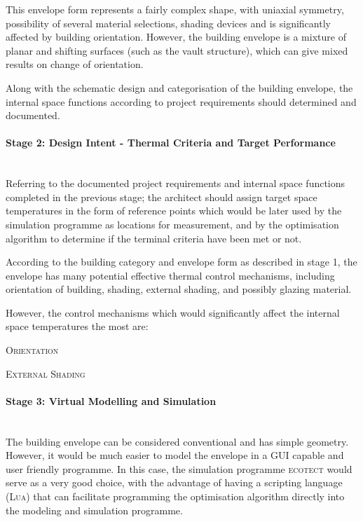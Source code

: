 This envelope form represents a fairly complex shape, with uniaxial symmetry, possibility of several material selections, shading devices and is significantly affected by building orientation. However, the building envelope is a mixture of planar and shifting surfaces (such as the vault structure), which can give mixed results on change of orientation.

Along with the schematic design and categorisation of the building envelope, the internal space functions according to project requirements should determined and documented.

\paragraph{Stage 2: Design Intent - Thermal Criteria and Target Performance}\mbox{}\\

Referring to the documented project requirements and internal space functions completed in the previous stage; the architect should assign target space temperatures in the form of reference points which would be later used by the simulation programme as locations for measurement, and by the optimisation algorithm to determine if the terminal criteria have been met or not.

According to the building category and envelope form as described in stage 1, the envelope has many potential effective thermal control mechanisms, including orientation of building, shading, external shading, and possibly glazing material.

However, the control mechanisms which would significantly affect the internal space temperatures the most are:
\begin{compactenum}
	\item \textsc{Orientation}
	\item \textsc{External Shading}
\end{compactenum}

\paragraph{Stage 3: Virtual Modelling and Simulation}\mbox{}\\

The building envelope can be considered conventional and has simple geometry. However, it would be much easier to model the envelope in a GUI capable and user friendly programme. In this case, the simulation programme \textsc{ecotect} would serve as a very good choice, with the advantage of having a scripting language (\textsc{Lua}) that can facilitate programming the optimisation algorithm directly into the modeling and simulation programme.

